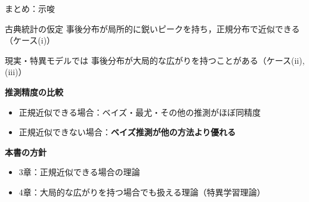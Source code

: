 \documentclass[aspectratio=169,11pt]{beamer}
\begin{document}
\begin{frame}{まとめ：示唆}
  \begin{block}{古典統計の仮定}
    事後分布が局所的に鋭いピークを持ち，正規分布で近似できる（ケース(i)）
  \end{block}

  \begin{alertblock}{現実・特異モデルでは}
    事後分布が大局的な広がりを持つことがある（ケース(ii), (iii)）
  \end{alertblock}

  \vspace{0.8em}
  \textbf{推測精度の比較}
  \begin{itemize}
    \item 正規近似できる場合：ベイズ・最尤・その他の推測がほぼ同精度
    \item 正規近似できない場合：\textbf{ベイズ推測が他の方法より優れる}
  \end{itemize}

  \vspace{0.8em}
  \textbf{本書の方針}
  \begin{itemize}
    \item 3章：正規近似できる場合の理論
    \item 4章：大局的な広がりを持つ場合でも扱える理論（特異学習理論）
  \end{itemize}
\end{frame}

\fi
\end{document}
